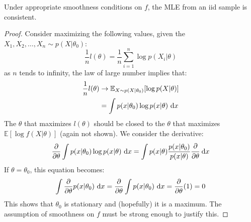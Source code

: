 \begin{theorem}
    Under appropriate smoothness conditions on $f$, the MLE from an iid sample is consistent.
\end{theorem}
\begin{proof}
    Consider maximizing the following values, given the $X_1,X_2,\dots,X_n \sim p(X|\theta_0)$:
    \begin{equation*}
        \frac{1}{n}l(\theta) = \frac{1}{n}\sum^n_{i=1}\log p(X_i | \theta)
    \end{equation*}
    as $n$ tends to infinity, the law of large number implies that:
    \begin{equation*}
    \begin{aligned}
        \frac{1}{n}l(\theta) &\rightarrow \mathbb{E}_{X \sim p(X | \theta_0)}[\log p(X | \theta)] \\
        &= \int p(x|\theta_0)\log p(x|\theta) \ \mathrm{d} x
    \end{aligned}
    \end{equation*}
    The $\theta$ that maximizes $l(\theta)$ should be closed to the $\theta$ that maximizes $\mathbb{E}[\log f(X|\theta)]$ (again not shown). We consider the derivative:
    \begin{equation*}
        \frac{\partial}{\partial \theta}\int p(x|\theta_0)\log p(x|\theta)\ \mathrm{d} x = \int p(x|\theta)\frac{p(x|\theta_0)}{p(x|\theta)} \cfrac{\partial}{\partial \theta} \ \mathrm{d} x
    \end{equation*}
    If $\theta=\theta_0$, this equation becomes:
    \begin{equation*}
        \int \frac{\partial}{\partial\theta}p(x|\theta_0)\ \mathrm{d} x = \frac{\partial}{\partial \theta} \int p(x|\theta_0)\ \mathrm{d} x = \frac{\partial}{\partial \theta}(1) = 0
    \end{equation*}
    This shows that $\theta_0$ is stationary and (hopefully) it is a maximum. The assumption of smoothness on $f$ must be strong enough to justify this. 
\end{proof}

